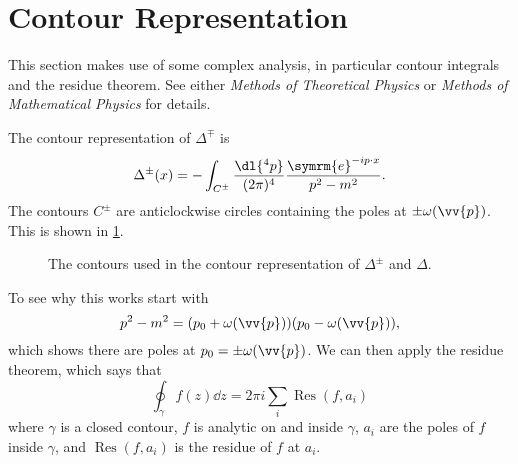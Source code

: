 \documentclass[fleqn]{NotesClass}
\newcommand*{\course}[1]{\textit{#1}}
\newcommand{\e}{\symrm{e}}
\let\Re\relax
\let\Im\relax
\DeclareMathOperator{\Re}{Re}
\DeclareMathOperator{\Im}{Im}
\DeclareMathOperator{\Res}{Res}
\begin{document}
    \section{Contour Representation}
    \begin{rmk}
        This section makes use of some complex analysis, in particular contour integrals and the residue theorem.
        See either \course{Methods of Theoretical Physics} or \course{Methods of Mathematical Physics} for details.
    \end{rmk}
    
    The contour representation of \(\Delta^{\mp}\) is
    \begin{equation}
        \Delta^{\pm}(x) = - \int_{C^{\pm}} \frac{\dl{^4p}}{(2\pi)^4} \frac{\e^{-ip\cdot x}}{p^2 - m^2}.
    \end{equation}
    The contours \(C^{\pm}\) are anticlockwise circles containing the poles at \(\pm\omega(\vv{p})\).
    This is shown in \cref{fig:contours for Delta}.
    
    \begin{figure}
        \caption{The contours used in the contour representation of \(\Delta^{\pm}\) and \(\Delta\).}
        \label{fig:contours for Delta}
    \end{figure}
    
    To see why this works start with
    \begin{equation}
        p^2 - m^2 = (p_0 + \omega(\vv{p})) (p_0 - \omega(\vv{p})),
    \end{equation}
    which shows there are poles at \(p_0 = \pm \omega(\vv{p})\).
    We can then apply the residue theorem, which says that 
    \begin{equation}
        \oint_\gamma f(z) \dd{z} = 2\pi i \sum_i \Res(f, a_i)
    \end{equation}
    where \(\gamma\) is a closed contour, \(f\) is analytic on and inside \(\gamma\), \(a_i\) are the poles of \(f\) inside \(\gamma\), and \(\Res(f, a_i)\) is the residue of \(f\) at \(a_i\).
    
\end{document}
